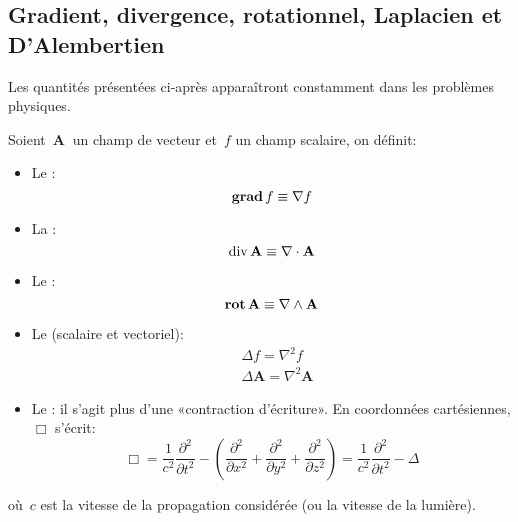 \medskip
\subsection{Gradient, divergence, rotationnel, Laplacien et D'Alembertien}
Les quantités présentées ci-après apparaîtront constamment dans les
problèmes physiques.%



\medskip
Soient~$\mathbf{A}~$ un champ de vecteur et~$f$ un champ scalaire, on définit:
\begin{itemize}
\item Le :
\begin{equation} \operatorname{\mathbf{grad}} f \equiv \nabla f \end{equation}

\item La :
\begin{equation} \operatorname{div} \mathbf{A} \equiv \nabla\cdot\mathbf{A} \end{equation}

\item Le :
\begin{equation} \operatorname{\mathbf{rot}} \mathbf{A} \equiv \nabla \wedge \mathbf{A} \end{equation}

\item Le  (scalaire et vectoriel):
\begin{align} &\Delta f = \nabla^2 f\\
&\Delta \mathbf{A} = \nabla^2 \mathbf{A} \end{align}

\item Le : il s'agit plus d'une «contraction d'écriture».
En coordonnées cartésiennes, $\Box$ s'écrit:
\begin{equation}
  \Box = \frac{1}{c^2}\frac{\partial^2}{\partial t^2} - \left(\frac{\partial^2}{\partial x^2} + \frac{\partial^2}{\partial y^2} + \frac{\partial^2}{\partial z^2}\right)
  = \frac{1}{c^2}\frac{\partial^2}{\partial t^2} - \Delta
\end{equation}
\end{itemize}
où~$c$ est la vitesse de la propagation considérée (ou la vitesse de la lumière).

